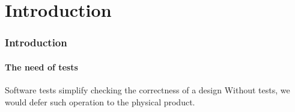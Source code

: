 \section{Introduction}

\begin{frame}
\frametitle{Introduction}
\framesubtitle{The need of tests}

\begin{block}{Software tests simplify checking the correctness of a design}
Without tests, we would defer such operation to the physical product.
\end{block}
\end{frame}

